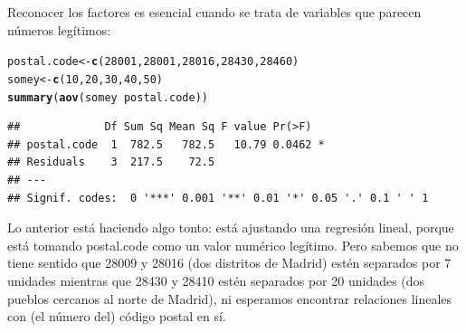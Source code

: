 \documentclass{config/apuntes}\usepackage[]{graphicx}\usepackage[]{xcolor}
\makeatletter
\newcommand{\hlnum}[1]{\textcolor[rgb]{0.686,0.059,0.569}{#1}}%
\newcommand{\hlopt}[1]{\textcolor[rgb]{0,0,0}{#1}}%
\newcommand{\hldef}[1]{\textcolor[rgb]{0.345,0.345,0.345}{#1}}%
\newcommand{\hlkwb}[1]{\textcolor[rgb]{0.69,0.353,0.396}{#1}}%
\newcommand{\hlkwd}[1]{\textcolor[rgb]{0.737,0.353,0.396}{\textbf{#1}}}%
\newenvironment{kframe}{%
 \def\at@end@of@kframe{}%
 \ifinner\ifhmode%
  \def\at@end@of@kframe{\end{minipage}}%
  \begin{minipage}{\columnwidth}%
 \fi\fi%
 \def\FrameCommand##1{\hskip\@totalleftmargin \hskip-\fboxsep
 \colorbox{shadecolor}{##1}\hskip-\fboxsep
     \hskip-\linewidth \hskip-\@totalleftmargin \hskip\columnwidth}%
 \MakeFramed {\advance\hsize-\width
   \@totalleftmargin\z@ \linewidth\hsize
   \@setminipage}}%
 {\par\unskip\endMakeFramed%
 \at@end@of@kframe}
\newenvironment{knitrout}{}{} %
\makeatother
\begin{document}
Reconocer los factores es esencial cuando se trata de variables que parecen números legítimos:
\begin{knitrout}
\color{fgcolor}\begin{kframe}
\begin{alltt}
\hldef{postal.code} \hlkwb{<-} \hlkwd{c}\hldef{(}\hlnum{28001}\hldef{,} \hlnum{28001}\hldef{,} \hlnum{28016}\hldef{,} \hlnum{28430}\hldef{,} \hlnum{28460}\hldef{)}
\hldef{somey} \hlkwb{<-} \hlkwd{c}\hldef{(}\hlnum{10}\hldef{,} \hlnum{20}\hldef{,} \hlnum{30}\hldef{,} \hlnum{40}\hldef{,} \hlnum{50}\hldef{)}
\hlkwd{summary}\hldef{(}\hlkwd{aov}\hldef{(somey} \hlopt{~} \hldef{postal.code))}
\end{alltt}
\begin{verbatim}
##             Df Sum Sq Mean Sq F value Pr(>F)  
## postal.code  1  782.5   782.5   10.79 0.0462 *
## Residuals    3  217.5    72.5                 
## ---
## Signif. codes:  0 '***' 0.001 '**' 0.01 '*' 0.05 '.' 0.1 ' ' 1
\end{verbatim}
\end{kframe}
\end{knitrout}

Lo anterior está haciendo algo tonto: está ajustando una regresión lineal, porque está tomando postal.code como un valor numérico legítimo. Pero sabemos que no tiene sentido que 28009 y 28016 (dos distritos de Madrid) estén separados por 7 unidades mientras que 28430 y 28410 estén separados por 20 unidades (dos pueblos cercanos al norte de Madrid), ni esperamos encontrar relaciones lineales con (el número del) código postal en sí.
\end{document}
